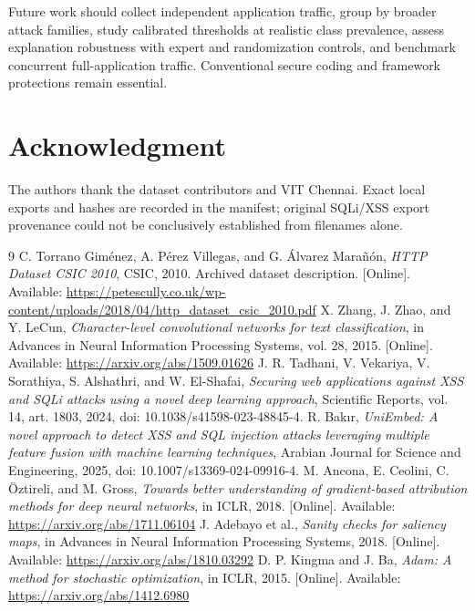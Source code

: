 \documentclass[conference]{IEEEtran}
\begin{document}
Future work should collect independent application traffic, group by broader attack families, study calibrated thresholds at realistic class prevalence, assess explanation robustness with expert and randomization controls, and benchmark concurrent full-application traffic. Conventional secure coding and framework protections remain essential.

\section*{Acknowledgment}
The authors thank the dataset contributors and VIT Chennai. Exact local exports and hashes are recorded in the manifest; original SQLi/XSS export provenance could not be conclusively established from filenames alone.

\begin{thebibliography}{9}
C. Torrano Gim\'enez, A. P\'erez Villegas, and G. \'Alvarez Mara\~n\'on, \emph{HTTP Dataset CSIC 2010}, CSIC, 2010. Archived dataset description. [Online]. Available: \url{https://petescully.co.uk/wp-content/uploads/2018/04/http_dataset_csic_2010.pdf}
X. Zhang, J. Zhao, and Y. LeCun, \emph{Character-level convolutional networks for text classification}, in Advances in Neural Information Processing Systems, vol. 28, 2015. [Online]. Available: \url{https://arxiv.org/abs/1509.01626}
J. R. Tadhani, V. Vekariya, V. Sorathiya, S. Alshathri, and W. El-Shafai, \emph{Securing web applications against XSS and SQLi attacks using a novel deep learning approach}, Scientific Reports, vol. 14, art. 1803, 2024, doi: 10.1038/s41598-023-48845-4.
R. Bak{\i}r, \emph{UniEmbed: A novel approach to detect XSS and SQL injection attacks leveraging multiple feature fusion with machine learning techniques}, Arabian Journal for Science and Engineering, 2025, doi: 10.1007/s13369-024-09916-4.
M. Ancona, E. Ceolini, C. \"Oztireli, and M. Gross, \emph{Towards better understanding of gradient-based attribution methods for deep neural networks}, in ICLR, 2018. [Online]. Available: \url{https://arxiv.org/abs/1711.06104}
J. Adebayo et al., \emph{Sanity checks for saliency maps}, in Advances in Neural Information Processing Systems, 2018. [Online]. Available: \url{https://arxiv.org/abs/1810.03292}
D. P. Kingma and J. Ba, \emph{Adam: A method for stochastic optimization}, in ICLR, 2015. [Online]. Available: \url{https://arxiv.org/abs/1412.6980}
\end{thebibliography}
\end{document}
